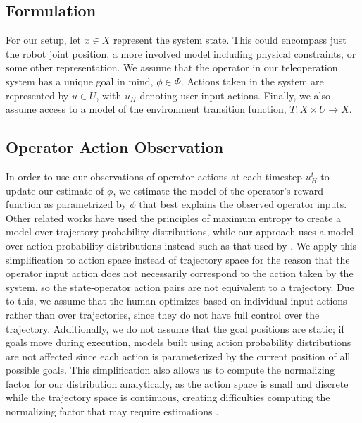 \documentclass[conference]{IEEEtran}
\begin{document}
\subsection{Formulation}

For our setup, let $ x \in X $ represent the system state. This could encompass just the robot joint position, a more involved model including physical constraints, or some other representation. We assume that the operator in our teleoperation system has a unique goal in mind, $\phi \in \Phi$. Actions taken in the system are represented by $ u \in U $, with $u_H$ denoting user-input actions. Finally, we also assume access to a model of the environment transition function, $T: X \times U \rightarrow X$.

\subsection{Operator Action Observation}
In order to use our observations of operator actions at each timestep $u_H^t$ to update our estimate of $\phi$, we estimate the model of the operator's reward function as parametrized by $\phi$ that best explains the observed operator inputs. Other related works \cite{dragan2012formalizing, javdani2015shared} have used the principles of maximum entropy \cite{ziebart2008maximum} to create a model over trajectory probability distributions, while our approach uses a model over action probability distributions instead such as that used by \citet{ramachandran2007bayesian}. We apply this simplification to action space instead of trajectory space for the reason that the operator input action does not necessarily correspond to the action taken by the system, so the state-operator action pairs are not equivalent to a trajectory. Due to this, we assume that the human optimizes based on individual input actions rather than over trajectories, since they do not have full control over the trajectory. Additionally, we do not assume that the goal positions are static; if goals move during execution, models built using action probability distributions are not affected since each action is parameterized by the current position of all possible goals. This simplification also allows us to compute the normalizing factor for our distribution analytically, as the action space is small and discrete while the trajectory space is continuous, creating difficulties computing the normalizing factor that may require estimations \cite{javdani2015shared}.
\end{document}
